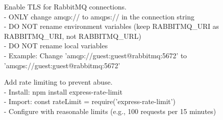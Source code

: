 
\begin{tcolorbox}[
    colback=gray!5!white,
    colframe=gray!75!black,
    title=\{\{FIX\_GUIDANCE\}\} bound for RULE\_ID = PLAINTEXT\_BROKER,
    fonttitle=\bfseries
]
\small\ttfamily
Enable TLS for RabbitMQ connections.\\
- ONLY change amqp:// to amqps:// in the connection string\\
- DO NOT rename environment variables (keep RABBITMQ\_URI as\\
\hspace*{1em}RABBITMQ\_URI, not RABBITMQ\_URL)\\
- DO NOT rename local variables\\
- Example: Change 'amqp://guest:guest@rabbitmq:5672' to\\
\hspace*{1em}'amqps://guest:guest@rabbitmq:5672'
\end{tcolorbox}

\begin{tcolorbox}[
    colback=gray!5!white,
    colframe=gray!75!black,
    title=\{\{FIX\_GUIDANCE\}\} bound for RULE\_ID = MISSING\_RATE\_LIMITING,
    fonttitle=\bfseries
]
\small\ttfamily
Add rate limiting to prevent abuse.\\
- Install: npm install express-rate-limit\\
- Import: const rateLimit = require('express-rate-limit')\\
- Configure with reasonable limits (e.g., 100 requests per 15 minutes)
\end{tcolorbox}
